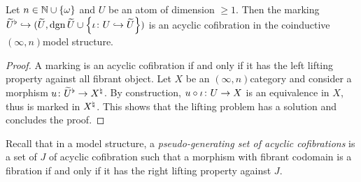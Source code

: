 \begin{lem} \label{lem:marked_localisation_acyclic}
    Let \( n \in \mathbb{N} \cup \left\{ {\omega} \right\} \) and \( U \) be an atom of dimension \( \geq 1 \).
    Then the marking \( {\widetilde{U}}^{\flat} \hookrightarrow (\widetilde{U}, \operatorname{dgn} \widetilde{U} \cup \left\{ {\iota \colon U \hookrightarrow \widetilde{U}} \right\}) \) is an acyclic cofibration in the coinductive \( (\infty, n) \)\nbd model structure.
\end{lem}
\begin{proof}
    A marking is an acyclic cofibration if and only if it has the left lifting property against all fibrant object.
    Let \( X \) be an \( (\infty, n) \)\nbd category and consider a morphism \( u \colon {\widetilde{U}}^{\flat} \to {X}^{\natural} \).
    By construction, \( u \circ \iota \colon U \to X \) is an equivalence in \( X \), thus is marked in \( {X}^{\natural} \).
    This shows that the lifting problem has a solution and concludes the proof.
\end{proof}

\noindent Recall that in a model structure, a \emph{pseudo-generating set of acyclic cofibrations} is a set of \( J \) of acyclic cofibration such that a morphism with fibrant codomain is a fibration if and only if it has the right lifting property against \( J \).

